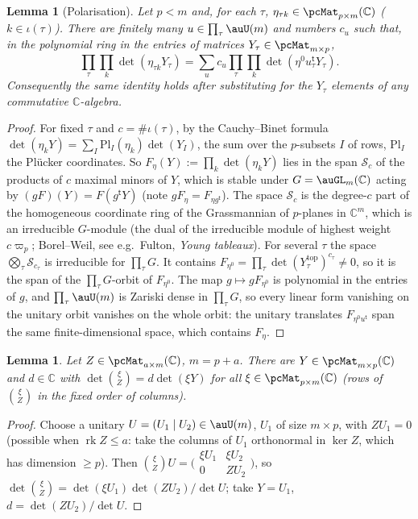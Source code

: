 \documentclass[10pt]{amsart}
\newtheorem{lemma}[theorem]{Lemma}
\theoremstyle{definition}
\theoremstyle{remark}
\newcommand{\C}{\mathbb C}
\begin{document}
\begin{lemma}[Polarisation]\label{pte:polar}
Let $p<m$ and, for each $\tau$, $\eta_{\tau k}\in\pcMat_{p\times m}(\C)$ ($k\in\iota(\tau)$). There are
finitely many $u\in\prod_\tau\auU(m)$ and numbers $c_u$ such that, in the polynomial ring in the entries
of matrices $Y_\tau\in\pcMat_{m\times p}$,
\[
\prod_\tau\prod_k\det(\eta_{\tau k}Y_\tau)=\sum_uc_u\prod_\tau\prod_k\det(\eta^0u_\tau^{\mathsf t}Y_\tau).
\]
Consequently the same identity holds after substituting for the $Y_\tau$ elements of any commutative
$\C$-algebra.
\end{lemma}
\begin{proof}
For fixed $\tau$ and $c=\#\iota(\tau)$, by the Cauchy--Binet formula $\det(\eta_kY)=\sum_I
\mathrm{Pl}_I(\eta_k)\det(Y_I)$, the sum over the $p$-subsets $I$ of rows, $\mathrm{Pl}_I$ the
Pl\"ucker coordinates. So $F_\eta(Y):=\prod_k\det(\eta_kY)$ lies in the span $\mathcal S_c$ of the
products of $c$ maximal minors of $Y$, which is stable under $G=\auGL_m(\C)$ acting by $(gF)(Y)=
F(g^{\mathsf t}Y)$ (note $gF_\eta=F_{\eta g^{\mathsf t}}$). The space $\mathcal S_c$ is the degree-$c$
part of the homogeneous coordinate ring of the Grassmannian of $p$-planes in $\C^m$, which is an
irreducible $G$-module (the dual of the irreducible module of highest weight $c\varpi_p$; Borel--Weil,
see e.g.\ Fulton, \emph{Young tableaux}). For several $\tau$ the space
$\bigotimes_\tau\mathcal S_{c_\tau}$ is irreducible for $\prod_\tau G$. It contains
$F_{\eta^0}=\prod_\tau\det(Y^{\mathrm{top}}_\tau)^{c_\tau}\ne0$, so it is the span of the
$\prod_\tau G$-orbit of $F_{\eta^0}$. The map $g\mapsto gF_{\eta^0}$ is polynomial in the entries of
$g$, and $\prod_\tau\auU(m)$ is Zariski dense in $\prod_\tau G$, so every linear form vanishing on the
unitary orbit vanishes on the whole orbit: the unitary translates $F_{\eta^0u^{\mathsf t}}$ span the
same finite-dimensional space, which contains $F_\eta$.
\end{proof}

\begin{lemma}\label{pte:stackeval}
Let $Z\in\pcMat_{a\times m}(\C)$, $m=p+a$. There are $Y\in\pcMat_{m\times p}(\C)$ and $d\in\C$ with
$\det\binom{\xi}{Z}=d\det(\xi Y)$ for all $\xi\in\pcMat_{p\times m}(\C)$ (rows of $\binom\xi Z$ in the
fixed order of columns).
\end{lemma}
\begin{proof}
Choose a unitary $U=(U_1\mid U_2)\in\auU(m)$, $U_1$ of size $m\times p$, with $ZU_1=0$ (possible when
$\operatorname{rk}Z\le a$: take the columns of $U_1$ orthonormal in $\ker Z$, which has dimension
$\ge p$). Then $\binom\xi ZU=\bigl(\begin{smallmatrix}\xi U_1&\xi U_2\\0&ZU_2\end{smallmatrix}\bigr)$, so
$\det\binom\xi Z=\det(\xi U_1)\det(ZU_2)/\det U$; take $Y=U_1$, $d=\det(ZU_2)/\det U$.
\end{proof}
\end{document}
